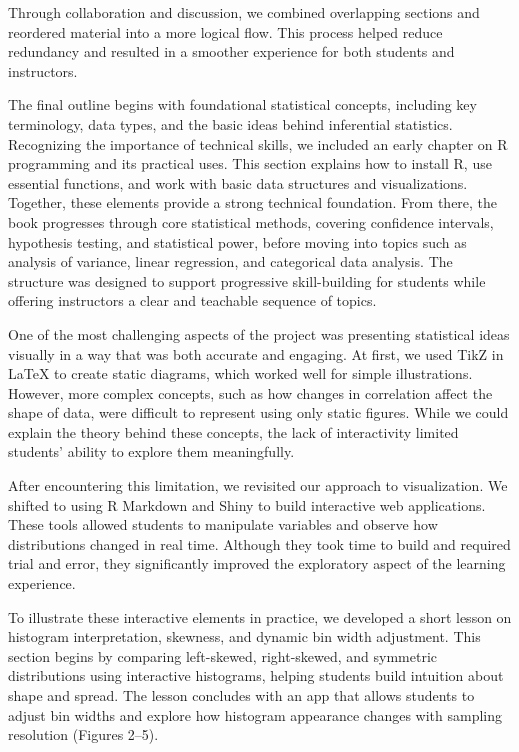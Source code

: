 \documentclass[11pt]{article}
\begin{document}
Through collaboration and discussion, we combined overlapping sections and reordered material into a more logical flow. This process helped reduce redundancy and resulted in a smoother experience for both students and instructors.

The final outline begins with foundational statistical concepts, including key terminology, data types, and the basic ideas behind inferential statistics. Recognizing the importance of technical skills, we included an early chapter on R programming and its practical uses. This section explains how to install R, use essential functions, and work with basic data structures and visualizations. Together, these elements provide a strong technical foundation. From there, the book progresses through core statistical methods, covering confidence intervals, hypothesis testing, and statistical power, before moving into topics such as analysis of variance, linear regression, and categorical data analysis. The structure was designed to support progressive skill-building for students while offering instructors a clear and teachable sequence of topics.

One of the most challenging aspects of the project was presenting statistical ideas visually in a way that was both accurate and engaging. At first, we used TikZ in LaTeX to create static diagrams, which worked well for simple illustrations. However, more complex concepts, such as how changes in correlation affect the shape of data, were difficult to represent using only static figures. While we could explain the theory behind these concepts, the lack of interactivity limited students’ ability to explore them meaningfully.

After encountering this limitation, we revisited our approach to visualization. We shifted to using R Markdown and Shiny to build interactive web applications. These tools allowed students to manipulate variables and observe how distributions changed in real time. Although they took time to build and required trial and error, they significantly improved the exploratory aspect of the learning experience.

To illustrate these interactive elements in practice, we developed a short lesson on histogram interpretation, skewness, and dynamic bin width adjustment. This section begins by comparing left-skewed, right-skewed, and symmetric distributions using interactive histograms, helping students build intuition about shape and spread. The lesson concludes with an app that allows students to adjust bin widths and explore how histogram appearance changes with sampling resolution (Figures 2–5).
\end{document}

